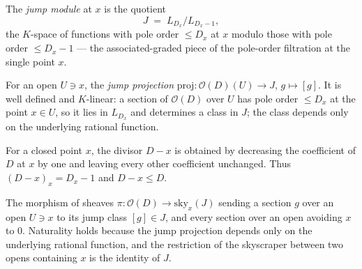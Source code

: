 \begin{definition}
  \label{def:jumpModule}
  \leanok
  The \emph{jump module} at \(x\) is the quotient
  \[
    J \;=\; L_{D_x} \big/ L_{D_x - 1},
  \]
  the \(K\)-space of functions with pole order \(\le D_x\) at \(x\) modulo those with pole order
  \(\le D_x - 1\) --- the associated-graded piece of the pole-order filtration at the single point
  \(x\).
\end{definition}

\begin{definition}
  \label{def:jumpProj}
  \leanok
  For an open \(U \ni x\), the \emph{jump projection} \(\mathrm{proj} : \mathcal O(D)(U) \to J\),
  \(g \mapsto [g]\). It is well defined and \(K\)-linear: a section of \(\mathcal O(D)\) over \(U\)
  has pole order \(\le D_x\) at the point \(x \in U\), so it lies in \(L_{D_x}\) and determines a
  class in \(J\); the class depends only on the underlying rational function.
\end{definition}

\begin{definition}
  \label{def:devissageDivisor}
  \leanok
  For a closed point \(x\), the divisor \(D - x\) is obtained by decreasing the coefficient of \(D\)
  at \(x\) by one and leaving every other coefficient unchanged. Thus \((D-x)_x = D_x - 1\) and
  \(D - x \le D\).
\end{definition}

\begin{definition}
  \label{def:devissagePi}
  \leanok
  The morphism of sheaves \(\pi : \mathcal O(D) \to \mathrm{sky}_x(J)\) sending a section \(g\) over
  an open \(U \ni x\) to its jump class \([g] \in J\), and every section over an open avoiding \(x\)
  to \(0\). Naturality holds because the jump projection depends only on the underlying rational
  function, and the restriction of the skyscraper between two opens containing \(x\) is the identity
  of \(J\).
\end{definition}

